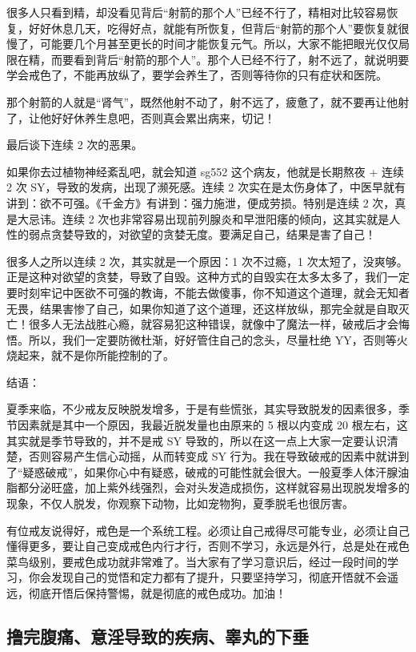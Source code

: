 \documentclass{ctexart}
\begin{document}
很多人只看到精，却没看见背后“射箭的那个人”已经不行了，精相对比较容易恢复，好好休息几天，吃得好点，就能有所恢复，但背后“射箭的那个人”要恢复就很慢了，可能要几个月甚至更长的时间才能恢复元气。所以，大家不能把眼光仅仅局限在精，而要看到背后“射箭的那个人”。那个人已经不行了，射不远了，就说明要学会戒色了，不能再放纵了，要学会养生了，否则等待你的只有症状和医院。

那个射箭的人就是“肾气”，既然他射不动了，射不远了，疲惫了，就不要再让他射了，让他好好休养生息吧，否则真会累出病来，切记！

最后谈下连续 2 次的恶果。

如果你去过植物神经紊乱吧，就会知道 sg552 这个病友，他就是长期熬夜 + 连续 2 次 SY，导致的发病，出现了濒死感。连续 2 次实在是太伤身体了，中医早就有讲到：欲不可强。《千金方》有讲到：强力施泄，便成劳损。特别是连续 2 次，真是大忌讳。连续 2 次也非常容易出现前列腺炎和早泄阳痿的倾向，这其实就是人性的弱点贪婪导致的，对欲望的贪婪无度。要满足自己，结果是害了自己！

很多人之所以连续 2 次，其实就是一个原因：1 次不过瘾，1 次太短了，没爽够。正是这种对欲望的贪婪，导致了自毁。这种方式的自毁实在太多太多了，我们一定要时刻牢记中医欲不可强的教诲，不能去做傻事，你不知道这个道理，就会无知者无畏，结果害惨了自己，如果你知道了这个道理，还这样放纵，那完全就是自取灭亡！很多人无法战胜心瘾，就容易犯这种错误，就像中了魔法一样，破戒后才会悔悟。所以，我们一定要防微杜渐，好好管住自己的念头，尽量杜绝 YY，否则等火烧起来，就不是你所能控制的了。

结语：

夏季来临，不少戒友反映脱发增多，于是有些慌张，其实导致脱发的因素很多，季节因素就是其中一个原因，我最近脱发量也由原来的 5 根以内变成 20 根左右，这其实就是季节导致的，并不是戒 SY 导致的，所以在这一点上大家一定要认识清楚，否则容易产生信心动摇，从而转变成 SY 行为。我在导致破戒的因素中就讲到了“疑惑破戒”，如果你心中有疑惑，破戒的可能性就会很大。一般夏季人体汗腺油脂都分泌旺盛，加上紫外线强烈，会对头发造成损伤，这样就容易出现脱发增多的现象，不仅人脱发，你观察下动物，比如宠物狗，夏季脱毛也很厉害。

有位戒友说得好，戒色是一个系统工程。必须让自己戒得尽可能专业，必须让自己懂得更多，要让自己变成戒色内行才行，否则不学习，永远是外行，总是处在戒色菜鸟级别，要戒色成功就非常难了。当大家有了学习意识后，经过一段时间的学习，你会发现自己的觉悟和定力都有了提升，只要坚持学习，彻底开悟就不会遥远，彻底开悟后保持警惕，就是彻底的戒色成功。加油！

\subsection{撸完腹痛、意淫导致的疾病、睾丸的下垂}
\end{document}
